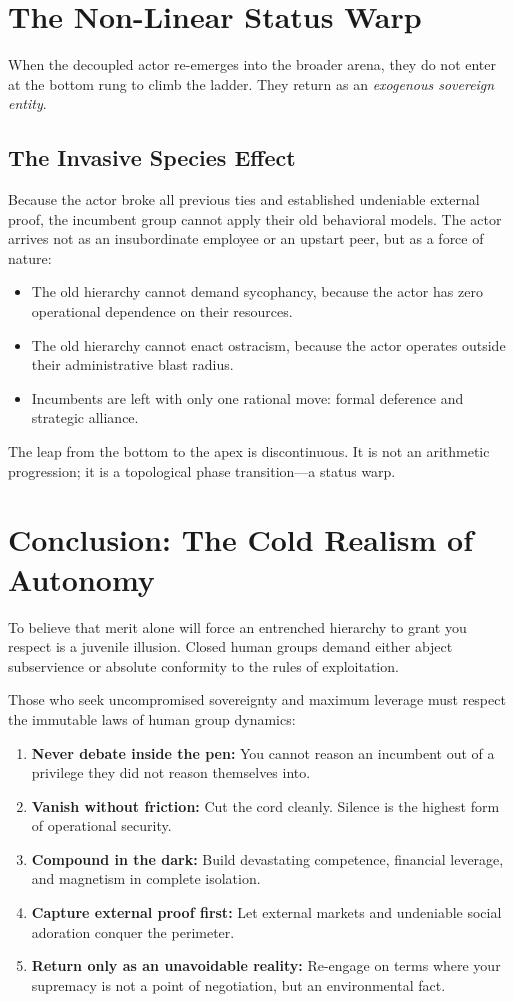 \documentclass[11pt,a4paper]{article}
\begin{document}
\section{The Non-Linear Status Warp}
When the decoupled actor re-emerges into the broader arena, they do not enter at the bottom rung to climb the ladder. They return as an \emph{exogenous sovereign entity}.

\subsection{The Invasive Species Effect}
Because the actor broke all previous ties and established undeniable external proof, the incumbent group cannot apply their old behavioral models. The actor arrives not as an insubordinate employee or an upstart peer, but as a force of nature:
\begin{itemize}
    \item The old hierarchy cannot demand sycophancy, because the actor has zero operational dependence on their resources.
    \item The old hierarchy cannot enact ostracism, because the actor operates outside their administrative blast radius.
    \item Incumbents are left with only one rational move: formal deference and strategic alliance.
\end{itemize}

The leap from the bottom to the apex is discontinuous. It is not an arithmetic progression; it is a topological phase transition—a status warp.

\section{Conclusion: The Cold Realism of Autonomy}
To believe that merit alone will force an entrenched hierarchy to grant you respect is a juvenile illusion. Closed human groups demand either abject subservience or absolute conformity to the rules of exploitation. 

Those who seek uncompromised sovereignty and maximum leverage must respect the immutable laws of human group dynamics:
\begin{enumerate}
    \item \textbf{Never debate inside the pen:} You cannot reason an incumbent out of a privilege they did not reason themselves into.
    \item \textbf{Vanish without friction:} Cut the cord cleanly. Silence is the highest form of operational security.
    \item \textbf{Compound in the dark:} Build devastating competence, financial leverage, and magnetism in complete isolation.
    \item \textbf{Capture external proof first:} Let external markets and undeniable social adoration conquer the perimeter.
    \item \textbf{Return only as an unavoidable reality:} Re-engage on terms where your supremacy is not a point of negotiation, but an environmental fact.
\end{enumerate}
\end{document}
